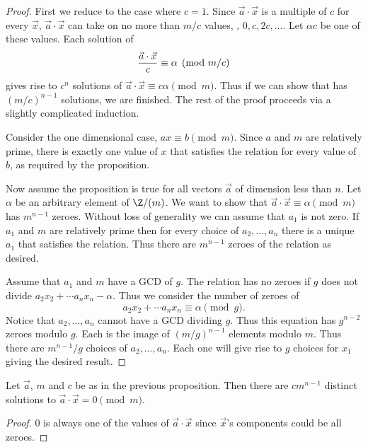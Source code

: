\begin{proof}
First we reduce to the case where $c = 1$.  Since $\vec a \cdot \vec x$ is
a multiple of $c$ for every $\vec x$, $\vec a \cdot \vec x$ can take on no more
than $m/c$ values, \ie, $0, c, 2c, \ldots$.  Let $\alpha c$ be one of these
values.  Each solution of 
\begin{equation}
{\vec a \cdot \vec x \over c} \equiv \alpha \pmod{m/c} 
\label{Eq:c}
\end{equation}
gives rise to $c^n$ solutions of $\vec a \cdot \vec x \equiv c \alpha
\pmod{m}$.  Thus if we can show that  has $(m/c)^{n-1}$
solutions, we are finished.  The rest of the proof proceeds via a
slightly complicated induction.

Consider the one dimensional case, $a x \equiv b \pmod{m}$.  Since $a$
and $m$ are relatively prime, there is exactly one value of $x$ that
satisfies the relation for every value of $b$, as required by the
proposition.

Now assume the proposition is true for all vectors $\vec a$ of
dimension less than $n$.  Let $\alpha$ be an arbitrary element of
$\Z/(m)$.  We want to show that $\vec a \cdot \vec x \equiv \alpha
\pmod{m}$ has $m^{n-1}$ zeroes.  Without loss of generality we can
assume that $a_1$ is not zero.  If $a_1$ and $m$ are relatively prime
then for every choice of $a_2, \ldots, a_n$ there is a unique $a_1$
that satisfies the relation.  Thus there are $m^{n-1}$ zeroes of the
relation as desired.

Assume that $a_1$ and $m$ have a GCD of $g$.  The relation has no
zeroes if $g$ does not divide $a_2 x_2 + \cdots a_n x_n - \alpha$.
Thus we consider the number of zeroes of
\[
a_2 x_2 + \cdots a_n x_n \equiv \alpha \pmod{g}.
\]
Notice that $a_2, \ldots, a_n$ cannot have a GCD dividing $g$.  Thus
this equation has $g^{n-2}$ zeroes modulo $g$.  Each is the image of
$(m/g)^{n-1}$ elements modulo $m$.  Thus there are $m^{n-1}/g$ choices
of $a_2, \ldots, a_n$.  Each one will give rise to $g$ choices for
$x_1$ giving the desired result.
\end{proof}

\begin{proposition}
\label{SPMod:Count:Solns:Prop}
Let $\vec a$, $m$ and $c$ be as in the previous proposition.  Then there
are $c m^{n-1}$ distinct solutions to $\vec a \cdot \vec x = 0 \pmod{m}$.
\end{proposition}

\begin{proof}
$0$ is always one of the values of $\vec a \cdot \vec x$ since $\vec
x$'s components could be all zeroes.
\end{proof}

